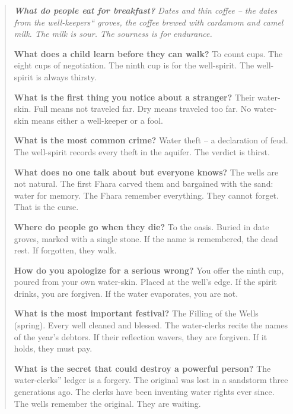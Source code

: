 \documentclass[12pt,oneside]{book}
\newenvironment{almanac}
  {\begin{quote}\small\itshape}
  {\end{quote}}
\begin{document}
\vspace{1em}
\begin{almanac}
\textbf{What do people eat for breakfast?} Dates and thin coffee -- the dates from the well-keepers`` groves, the coffee brewed with cardamom and camel milk. The milk is sour. The sourness is for endurance.

\textbf{What does a child learn before they can walk?} To count cups. The eight cups of negotiation. The ninth cup is for the well-spirit. The well-spirit is always thirsty.

\textbf{What is the first thing you notice about a stranger?} Their water-skin. Full means not traveled far. Dry means traveled too far. No water-skin means either a well-keeper or a fool.

\textbf{What is the most common crime?} Water theft -- a declaration of feud. The well-spirit records every theft in the aquifer. The verdict is thirst.

\textbf{What does no one talk about but everyone knows?} The wells are not natural. The first Fhara carved them and bargained with the sand: water for memory. The Fhara remember everything. They cannot forget. That is the curse.

\textbf{Where do people go when they die?} To the oasis. Buried in date groves, marked with a single stone. If the name is remembered, the dead rest. If forgotten, they walk.

\textbf{How do you apologize for a serious wrong?} You offer the ninth cup, poured from your own water-skin. Placed at the well's edge. If the spirit drinks, you are forgiven. If the water evaporates, you are not.

\textbf{What is the most important festival?} The Filling of the Wells (spring). Every well cleaned and blessed. The water-clerks recite the names of the year's debtors. If their reflection wavers, they are forgiven. If it holds, they must pay.

\textbf{What is the secret that could destroy a powerful person?} The water-clerks'' ledger is a forgery. The original was lost in a sandstorm three generations ago. The clerks have been inventing water rights ever since. The wells remember the original. They are waiting.
\end{almanac}
\end{document}
